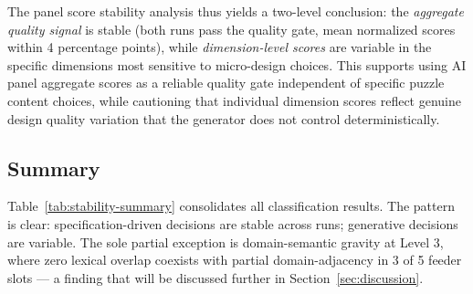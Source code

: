 The panel score stability analysis thus yields a two-level conclusion: the \textit{aggregate quality signal} is stable (both runs pass the quality gate, mean normalized scores within 4 percentage points), while \textit{dimension-level scores} are variable in the specific dimensions most sensitive to micro-design choices. This supports using AI panel aggregate scores as a reliable quality gate independent of specific puzzle content choices, while cautioning that individual dimension scores reflect genuine design quality variation that the generator does not control deterministically.

\subsection{Summary}
\label{sec:results-summary}

Table~\ref{tab:stability-summary} consolidates all classification results. The pattern is clear: specification-driven decisions are stable across runs; generative decisions are variable. The sole partial exception is domain-semantic gravity at Level 3, where zero lexical overlap coexists with partial domain-adjacency in 3 of 5 feeder slots --- a finding that will be discussed further in Section~\ref{sec:discussion}.

